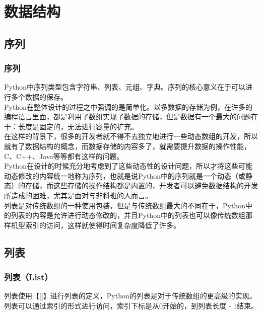\chapter{数据结构}

\section{序列}

\subsection{序列}

Python中序列类型包含字符串、列表、元组、字典。序列的核心意义在于可以进行多个数据的保存。\\

Python在整体设计的过程之中强调的是简单化。以多数据的存储为例，在许多的编程语言里面，都是利用了数组实现了数据的存储，但是数据有一个最大的问题在于：长度是固定的，无法进行容量的扩充。\\

在这样的背景下，很多的开发者就不得不去独立地进行一些动态数组的开发，所以就有了数据结构的概念，而数据存储的内容多了，就需要提升数据的操作性能，C、C++、Java等等都有这样的问题。\\

Python在设计的时候充分地考虑到了这些动态性的设计问题，所以才将这些可能动态修改的内容统一地称为序列，也就是说Python中的序列就是一个动态（或静态）的存储，而这些存储的操作结构都是内置的，开发者可以避免数据结构的开发所造成的困难，尤其是面对与非科班的人而言。\\

列表是对传统数组的一种使用包装，但是与传统数组最大的不同在于，Python中的列表的内容是允许进行动态修改的，并且Python中的列表也可以像传统数组那样机型索引的访问，这样就使得时间复杂度降低了许多。

\newpage

\section{列表}

\subsection{列表（List）}

列表使用【[]】进行列表的定义，Python的列表是对于传统数组的更高级的实现。列表可以通过索引的形式进行访问，索引下标是从0开始的，到列表长度 - 1结束。\\


